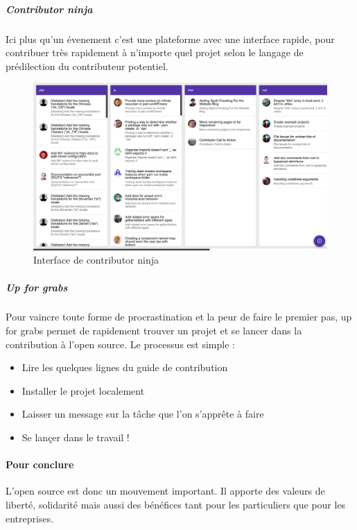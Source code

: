 				\subparagraph{Contributor ninja\\}

				Ici plus qu'un évenement c'est une plateforme avec une interface rapide, pour contribuer très rapidement à n'importe quel projet selon le langage de prédilection du contributeur potentiel.

				\begin{figure}[!htb]
					\center
					\includegraphics[scale=0.30]{./img/ninja_os}
					\caption{Interface de contributor ninja}					
				\end{figure}

				\subparagraph{Up for grabs\\}

				Pour vaincre toute forme de procrastination et la peur de faire le premier pas, up for grabs permet de rapidement trouver un projet et se lancer dans la contribution à l'open source. Le processus est simple :

				\begin{itemize}[label=\textbullet, font=\LARGE \color{burntorange}]
					\item Lire les quelques lignes du guide de contribution
					\item Installer le projet localement
					\item Laisser un message sur la tâche que l'on s'apprête à faire
					\item Se lançer dans le travail !
				\end{itemize}
		
		\paragraph{Pour conclure\\}

			L’open source est donc un mouvement important. Il apporte des valeurs de liberté, solidarité mais aussi des bénéfices tant pour les particuliers que pour les entreprises. 
		
